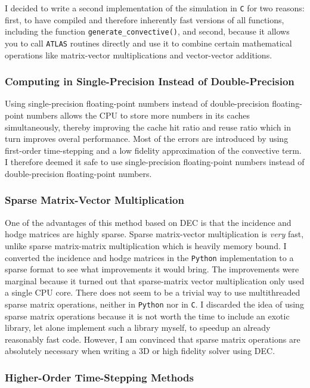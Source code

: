 I decided to write a second implementation of the simulation in \texttt{C} for two reasons: first, to have compiled and therefore inherently fast versions of all functions, including the function \lstinline|generate_convective()|, and second, because it allows you to call \texttt{ATLAS} routines directly and use it to combine certain mathematical operations like matrix-vector multiplications and vector-vector additions.

\subsubsection{Computing in Single-Precision Instead of Double-Precision}

Using single-precision floating-point numbers instead of double-precision floating-point numbers allows the CPU to store more numbers in its caches simultaneously, thereby improving the cache hit ratio and reuse ratio which in turn improves overal performance. Most of the errors are introduced by using first-order time-stepping and a low fidelity approximation of the convective term. I therefore deemed it safe to use single-precision floating-point numbers instead of double-precision floating-point numbers.

\subsubsection{Sparse Matrix-Vector Multiplication}

One of the advantages of this method based on DEC is that the incidence and hodge matrices are highly sparse. Sparse matrix-vector multiplication is \emph{very} fast, unlike sparse matrix-matrix multiplication which is heavily memory bound. I converted the incidence and hodge matrices in the \texttt{Python} implementation to a sparse format to see what improvements it would bring. The improvements were marginal because it turned out that sparse-matrix vector multiplication only used a single CPU core. There does not seem to be a trivial way to use multithreaded sparse matrix operations, neither in \texttt{Python} nor in \texttt{C}. I discarded the idea of using sparse matrix operations because it is not worth the time to include an exotic library, let alone implement such a library myself, to speedup an already reasonably fast code. However, I am convinced that sparse matrix operations are absolutely necessary when writing a 3D or high fidelity solver using DEC.

\subsubsection{Higher-Order Time-Stepping Methods}

